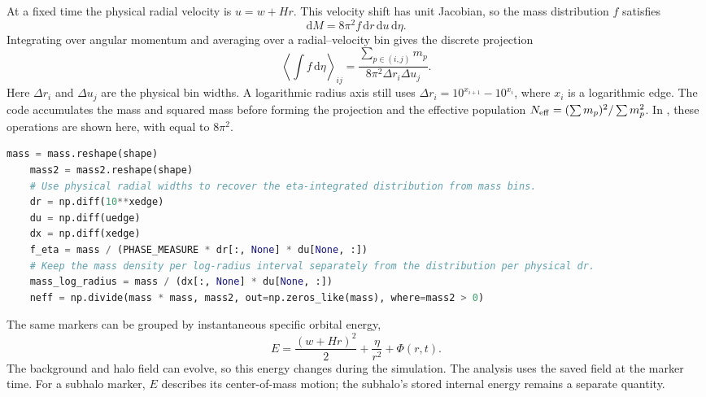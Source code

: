 At a fixed time the physical radial velocity is $u=w+Hr$. This velocity
shift has unit Jacobian, so the mass distribution $f$ satisfies
\begin{equation}
 \boxed{\mathrm dM=8\pi^2 f\,\mathrm dr\,\mathrm du\,\mathrm d\eta.}
 \label{eq:df-analysis-measure}
\end{equation}
Integrating over angular momentum and averaging over a radial--velocity
bin gives the discrete projection
\begin{equation}
 \boxed{\left\langle\int f\,\mathrm d\eta\right\rangle_{ij}
 =\frac{\sum_{p\in(i,j)}m_p}{8\pi^2\Delta r_i\Delta u_j}.}
 \label{eq:df-analysis-phase-bin}
\end{equation}
Here $\Delta r_i$ and $\Delta u_j$ are the physical bin widths. A
logarithmic radius axis still uses
$\Delta r_i=10^{x_{i+1}}-10^{x_i}$, where $x_i$ is a logarithmic edge.
The code accumulates the mass and squared mass before forming the
projection and the effective population
$N_{\rm eff}=(\sum m_p)^2/\sum m_p^2$. In
, these operations
are shown here, with  equal to $8\pi^2$.
\begin{lstlisting}[language=Python]
    mass = mass.reshape(shape)
    mass2 = mass2.reshape(shape)
    # Use physical radial widths to recover the eta-integrated distribution from mass bins.
    dr = np.diff(10**xedge)
    du = np.diff(uedge)
    dx = np.diff(xedge)
    f_eta = mass / (PHASE_MEASURE * dr[:, None] * du[None, :])
    # Keep the mass density per log-radius interval separately from the distribution per physical dr.
    mass_log_radius = mass / (dx[:, None] * du[None, :])
    neff = np.divide(mass * mass, mass2, out=np.zeros_like(mass), where=mass2 > 0)
\end{lstlisting}

The same markers can be grouped by instantaneous specific orbital energy,
\begin{equation}
 \boxed{E=\frac{(w+Hr)^2}{2}+\frac{\eta}{r^2}+\Phi(r,t).}
 \label{eq:df-analysis-energy}
\end{equation}
The background and halo field can evolve, so this energy changes during
the simulation. The analysis uses the saved field at the marker time.
For a subhalo marker, $E$ describes its center-of-mass motion; the
subhalo's stored internal energy remains a separate quantity.

